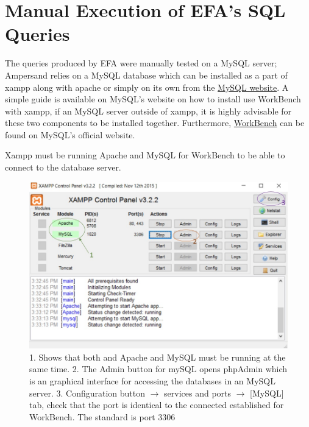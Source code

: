 \section{Manual Execution of EFA's SQL Queries}

The queries produced by EFA were manually tested on a MySQL server; Ampersand 
relies on a MySQL database which can be installed as a part of xampp along with 
apache or simply on its own from the 
\href{https://dev.mysql.com/downloads/mysql/}{MySQL website}. A simple guide is 
available on MySQL's website on how to install use WorkBench with xampp, if an 
MySQL server outside of xampp, it is highly advisable for these two components 
to be installed together. Furthermore, 
\href{https://dev.mysql.com/downloads/workbench/}{WorkBench} can be found on 
MySQL's official website.

Xampp must be running Apache and MySQL for WorkBench to be able to connect to 
the database server. 
\begin{figure}[!h]
    \includegraphics[width=\textwidth]{images/xampp}
    \caption{\footnotesize{1. Shows that both and Apache and MySQL must be 
    running at the same time. 2. The Admin button for mySQL opens phpAdmin 
    which is an graphical interface for accessing the databases in an MySQL 
    server. 3. Configuration button $\rightarrow$ services and ports 
    $\rightarrow$ [MySQL] tab, check that the port is identical to the 
    connected established for WorkBench. The standard is port 3306 }}
\end{figure}


